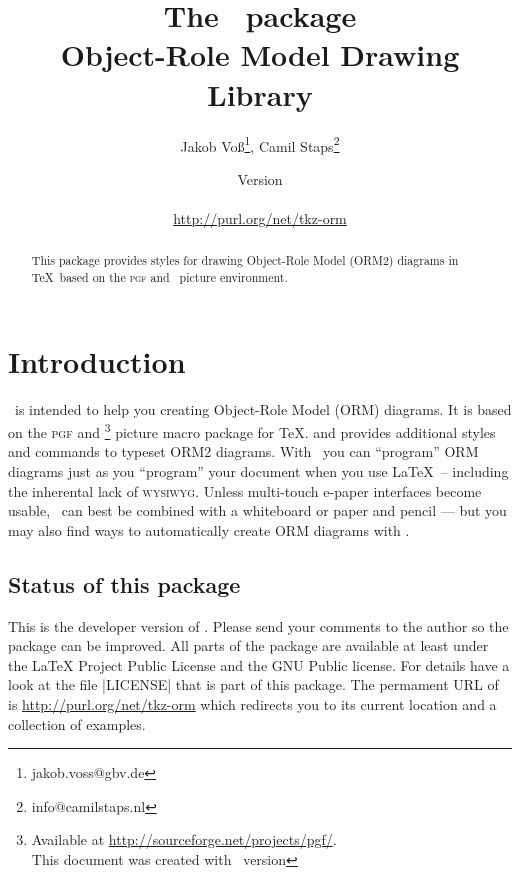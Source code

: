 \documentclass[a4paper,10pt]{article}
\title{The \tkzorm\ package\\Object-Role Model Drawing Library}
\author{Jakob Vo\ss\footnote{jakob.voss@gbv.de}, Camil Staps\footnote{info@camilstaps.nl}}
\date{Version \ormVersion\\\ormDate\\[5mm]\url{http://purl.org/net/tkz-orm}}
\begin{document}
\maketitle

\begin{abstract}\noindent
This package provides styles for drawing Object-Role Model (ORM2) diagrams
in \TeX\ based on the \textsc{pgf} and \tikzname\ picture environment.
\end{abstract}

\tableofcontents
\pagebreak

\section{Introduction}
\label{sec:introduction}

\tkzorm\ is intended to help you creating Object-Role Model (ORM) diagrams. It is based on the \textsc{pgf} and \tikzname\footnote{Available at \url{http://sourceforge.net/projects/pgf/}.\\This document was created with \tikzname\ version \pgftypesetversion} picture macro package for \TeX. and provides additional styles and commands to typeset ORM2 diagrams. With \tkzorm\ you can ``program'' ORM diagrams just as you ``program'' your document when you use \LaTeX\ -- including the inherental lack of \textsc{wysiwyg}. Unless multi-touch e-paper interfaces become usable, \tkzorm\ can best be combined with a whiteboard or paper and pencil --- but you may also find ways to automatically create ORM diagrams with \tkzorm.

\subsection*{Status of this package}
This is the developer version of \tkzorm. Please send your comments to the author so the package can be improved. All parts of the package are available at least under the \LaTeX{} Project Public License\cite{LPPL} and the GNU Public license\cite{GPL2}. For details have a look at the file |LICENSE| that is part of this package. The permament URL of \tkzorm is \url{http://purl.org/net/tkz-orm} which redirects you to its current location and a collection of examples.
\end{document}
